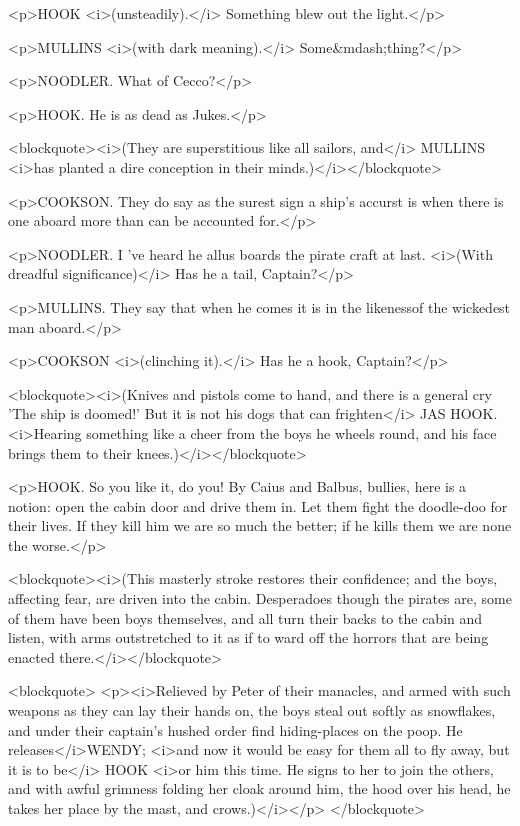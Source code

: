 <p>HOOK <i>(unsteadily).</i> Something blew out the light.</p>

<p>MULLINS <i>(with dark meaning).</i> Some&mdash;thing?</p>

<p>NOODLER. What of Cecco?</p>

<p>HOOK. He is as dead as Jukes.</p>

<blockquote><i>(They are superstitious like all sailors, and</i> MULLINS <i>has planted a dire conception in their minds.)</i></blockquote>

<p>COOKSON. They do say as the surest sign a ship's accurst is when there is one aboard more than can be accounted for.</p>

<p>NOODLER. I 've heard he allus boards the pirate craft at last. <i>(With dreadful significance)</i> Has he a tail, Captain?</p>

<p>MULLINS. They say that when he comes it is in the likenessof the wickedest man aboard.</p>

<p>COOKSON <i>(clinching it).</i> Has he a hook, Captain?</p>

<blockquote><i>(Knives and pistols come to hand, and there is a general cry 'The ship is doomed!' But it is not his dogs that can frighten</i> JAS HOOK. <i>Hearing something like a cheer from the boys he wheels round, and his face brings them to their knees.)</i></blockquote>

<p>HOOK. So you like it, do you! By Caius and Balbus, bullies, here is a notion: open the cabin door and drive them in. Let them fight the doodle-doo for their lives. If they kill him we are so much the better; if he kills them we are none the worse.</p>

<blockquote><i>(This masterly stroke restores their confidence; and the boys, affecting fear, are driven into the cabin. Desperadoes though the pirates are, some of them have been boys themselves, and all turn their backs to the cabin and listen, with arms outstretched to it as if to ward off the horrors that are being enacted there.</i></blockquote>

<blockquote> <p><i>Relieved by Peter of their manacles, and armed with such weapons as they can lay their hands on, the boys steal out softly as snowflakes, and under their captain's hushed order find hiding-places on the poop. He releases</i>WENDY; <i>and now it would be easy for them all to fly away, but it is to be</i> HOOK <i>or him this time. He signs to her to join the others, and with awful grimness folding her cloak around him, the hood over his head, he takes her place by the mast, and crows.)</i></p> </blockquote>

